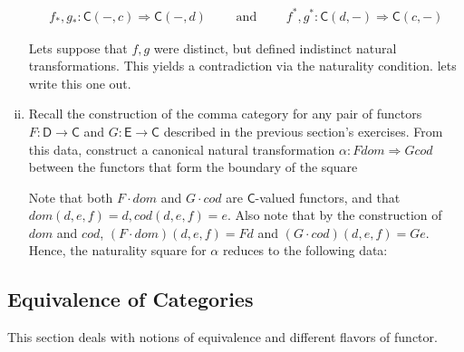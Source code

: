 \documentclass[10pt, oneside]{article}   	%
\newcommand{\cat}[1]{\bm{ \mathsf{#1} }}
\newcommand{\cc}{\cat{C}}
\newcommand{\dd}{\cat{D}}
\newcommand{\ee}{\cat{E}}
\newcommand{\nt}{\Rightarrow}
\begin{document}
\begin{enumerate}[(i)]
\[
\begin{aligned}
f_*,g_* : \cc(-,c) \Rightarrow \cc(-, d) \qquad \text{ and } \qquad f^*, g^* : \cc(d, -) \Rightarrow \cc(c, -)
\end{aligned}
\]

Lets suppose that $f,g$ were distinct, but defined indistinct natural transformations. This yields a contradiction via the naturality condition. lets write this one out. 

\item Recall the construction of the comma category for any pair of functors $F : \dd \to \cc$ and $G : \ee \to \cc$ described in the previous section's exercises. From this data, construct a canonical natural transformation $\alpha : F dom \nt G cod$ between the functors that form the boundary of the square

\begin{center}
\end{center}

Note that both $F \cdot dom$ and $G \cdot cod$ are $\cc$-valued functors, and that $dom (d, e, f) = d, cod (d, e, f) = e$. Also note that by the construction of $dom$ and $cod$, $(F \cdot dom)(d,e,f) = Fd$ and $(G \cdot cod)(d,e,f) = Ge$. Hence, the naturality square for $\alpha$ reduces to the following data: 

\begin{center}
\end{center}
\end{enumerate}

\subsection{Equivalence of Categories}

This section deals with notions of equivalence and different flavors of functor.
\end{document}
